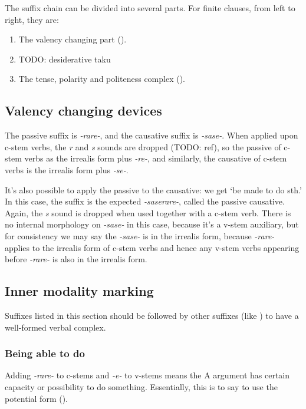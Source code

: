 \documentclass[UTF8, a4paper, oneside, scheme=plain]{ctexrep}
\newcommand{\corpus}[1]{\emph{#1}}
\newcommand{\translate}[1]{`#1'}
\begin{document}
The suffix chain can be divided into several parts. 
For finite clauses, from left to right, they are:
\begin{enumerate}
    \item The valency changing part ().
    \item TODO: desiderative taku
    \item The tense, polarity and politeness complex ().
\end{enumerate}

\subsection{Valency changing devices}\label{sec:valency-changing}

The passive suffix is \corpus{-rare-},
and the causative suffix is \corpus{-sase-}.
When applied upon c-stem verbs,
the \corpus{r} and \corpus{s} sounds are dropped (TODO: ref),
so the passive of c-stem verbs as the irrealis form plus \corpus{-re-},
and similarly,
the causative of c-stem verbs is the irrealis form plus \corpus{-se-}.

It's also possible to apply the passive to the causative:
we get \translate{be made to do sth.}
In this case, the suffix is the expected 
\corpus{-saserare-},
called the passive causative.
Again, the \corpus{s} sound is dropped when used together with a c-stem verb.
There is no internal morphology on \corpus{-sase-} in this case,
because it's a v-stem auxiliary, but for consistency we may say
the \corpus{-sase-} is in the irrealis form,
because \corpus{-rare-} applies to the irrealis form of c-stem verbs 
and hence any v-stem verbs appearing before \corpus{-rare-} is also in the irrealis form.

\subsection{Inner modality marking}

Suffixes listed in this section should be followed by other suffixes 
(like ) 
to have a well-formed verbal complex.

\subsubsection{Being able to do}\label{sec:be-able-to-do}

Adding \corpus{-rare-} to c-stems and \corpus{-e-} to v-stems 
means the A argument has certain capacity or possibility to do something.
Essentially, this is to say to use the potential form ().
\end{document}
